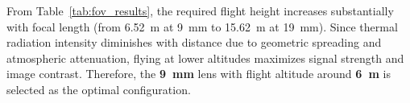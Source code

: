 From Table~\ref{tab:fov_results}, the required flight height increases substantially with focal length (from 6.52~m at 9~mm to 15.62~m at 19~mm). Since thermal radiation intensity diminishes with distance due to geometric spreading and atmospheric attenuation, flying at lower altitudes maximizes signal strength and image contrast. Therefore, the \textbf{9~mm} lens with flight altitude around \textbf{6~m} is selected as the optimal configuration.